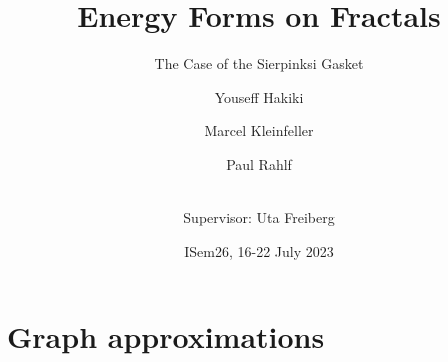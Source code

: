 \documentclass[notheorems]{beamer}
\title{Energy Forms on Fractals}
\subtitle{The Case of the Sierpinksi Gasket}
\author %
{Youseff Hakiki\inst{1} \and Marcel Kleinfeller\inst{2} \and Paul Rahlf\inst{3} \and \\[3mm] {\small Supervisor: Uta Freiberg\inst{4}}}
\institute[VFU] %
{
  \inst{1}%
  Cadi Ayyad University
  \and
  \inst{2}%
  Technical University of Darmstadt
  \and
  \inst{3}%
  Kiel University
  \and
  \inst{4}%
  Chemnitz University of Technology
}
\date %
{ISem26, 16-22 July 2023}
\theoremstyle{definition}
\theoremstyle{plain}
\theoremstyle{remark}
\newcommand{\1}{\mathds{1}} %
\begin{document}
\begin{frame}
    \titlepage
\end{frame}


\section{Graph approximations}



\end{document}
